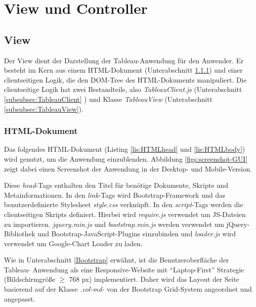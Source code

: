 \section{View und Controller}
\subsection{View}\label{subsec:View}
Der View dient der Darstellung der Tableau-Anwendung für den Anwender. Er besteht im Kern aus einem HTML-Dokument (Unterabschnitt \ref{subsubsec:HTML}) und einer clientseitigen Logik, die den DOM-Tree des HTML-Dokuments manipuliert. Die clientseitige Logik hat zwei Bestandteile, also \textit{TableauClient.js} (Unterabschnitt \ref{subsubsec:TableauClient} ) und Klasse \textit{TableauView} (Unterabschnitt \ref{subsubsec:TableauView}).
\subsubsection{HTML-Dokument} \label{subsubsec:HTML}
Das folgendes HTML-Dokument (Listing \ref{lis:HTMLhead} und \ref{lis:HTMLbody}) wird genutzt, um die Anwendung einzublenden. Abbildung  \ref{figs:screenshot-GUI} zeigt dabei einen Screenshot der Anwendung in der Desktop- und Mobile-Version.



Diese \textit{head}-Tags enthalten den Titel für benötige Dokumente, Skripte und Metainformationen. In den \textit{link}-Tags wird Bootstrap-Framework und das benutzerdefinierte Stylesheet \textit{style.css} verknüpft. In den \textit{script}-Tags werden die clientseitigen Skripts definiert. Hierbei wird \textit{require.js} verwendet um JS-Dateien zu importieren. \textit{jquery.min.js} und \textit{bootstrap.min.js} werden verwendet um jQuery-Bibliothek und Bootstrap-JavaScript-Plugins einzubinden und \textit{loader.js} wird verwendet um Google-Chart Loader zu laden.



Wie in Unterabschnitt \ref{Bootstrap} erwähnt, ist die Benutzeroberfläche der Tableau-
Anwendung als eine Responsive-Website mit ``Laptop-First'' Strategie (Bildschirmgröße $\geq$ 768 px) implementiert. Daher wird das Layout der Seite basierend auf der Klasse \textit{.col-md-} von der Bootstrap Grid-System angeordnet und angepasst.

